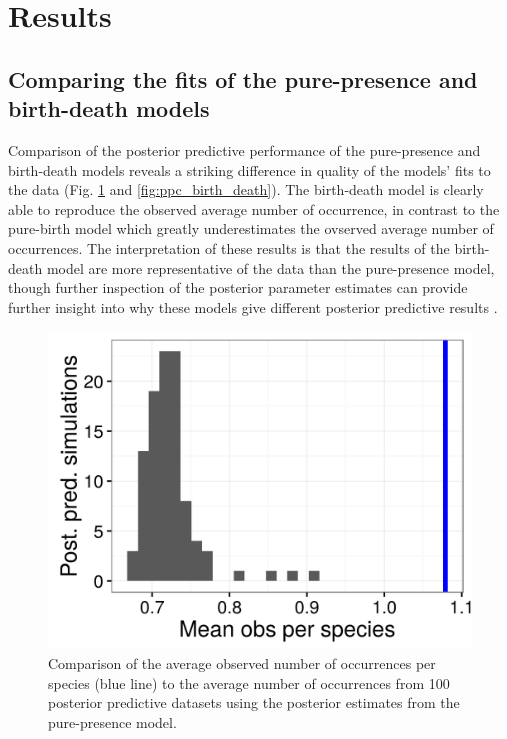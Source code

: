 \documentclass[12pt,letterpaper]{article}
\begin{document}
\section*{Results}

\subsection*{Comparing the fits of the pure-presence and birth-death models}


Comparison of the posterior predictive performance of the pure-presence and birth-death models reveals a striking difference in quality of the models' fits to the data (Fig. \ref{fig:ppc_pure_presence} and \ref{fig:ppc_birth_death}). The birth-death model is clearly able to reproduce the observed average number of occurrence, in contrast to the pure-birth model which greatly underestimates the ovserved average number of occurrences. The interpretation of these results is that the results of the birth-death model are more representative of the data than the pure-presence model, though further inspection of the posterior parameter estimates can provide further insight into why these models give different posterior predictive results \citep{Gelman2013d}.

\begin{figure}[ht]
  \centering
  \includegraphics[width=\textwidth,height=0.4\textheight,keepaspectratio=true]{figure/pred_occ}
  \caption[Posterior predictive check for pure-presence model]{Comparison of the average observed number of occurrences per species (blue line) to the average number of occurrences from 100 posterior predictive datasets using the posterior estimates from the pure-presence model.}
  \label{fig:ppc_pure_presence}
\end{figure}
\end{document}
